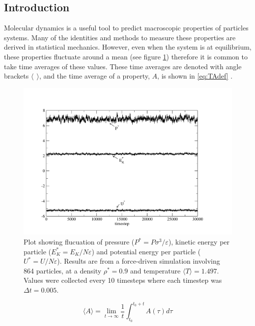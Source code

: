 \message{ !name(main.tex)}\documentclass[12pt]{UoAthesis}
\begin{document}
\subsection{Introduction}
Molecular dynamics is a useful tool to predict macroscopic properties
of particles systems.  Many of the identities and methods to measure
these properties are derived in statistical mechanics.  However, even
when the system is at equilibrium, these properties fluctuate around a
mean (see figure \ref{fig:fluctuations}) therefore it is common to
take time averages of these values. These time averages are denoted
with angle brackets $\langle\:\: \rangle$, and the time average of a
property, $A$, is shown in \eqref{eq:TAdef} \cite{Haile1997}.

\begin{figure}[htp] 
  \begin{center}
    \includegraphics[clip,width=\textwidth]{figures/energyplot} 
    \caption{\label{fig:fluctuations} Plot showing flucuation of pressure
      ($P^*=P\sigma^3/\varepsilon$), kinetic energy per particle
      ($E_K^*=E_K/N\varepsilon$) and potential energy per particle
      ($U^*=U/N\varepsilon$).  Results are from a force-driven simulation
      involving 864 particles, at a density $\rho^*=0.9$ and
      temperature $\langle T\rangle=1.497$. Values were collected
      every 10 timesteps where each timestep was $\Delta t = 0.005$.}
  \end{center}
\end{figure}

\begin{equation}
  \label{eq:TAdef}
  \langle A \rangle = \lim_{t \to \infty} \frac{1}{t}  \int^{t_0+t}_{t_0}A(\tau) d\tau
\end{equation}
\end{document}

